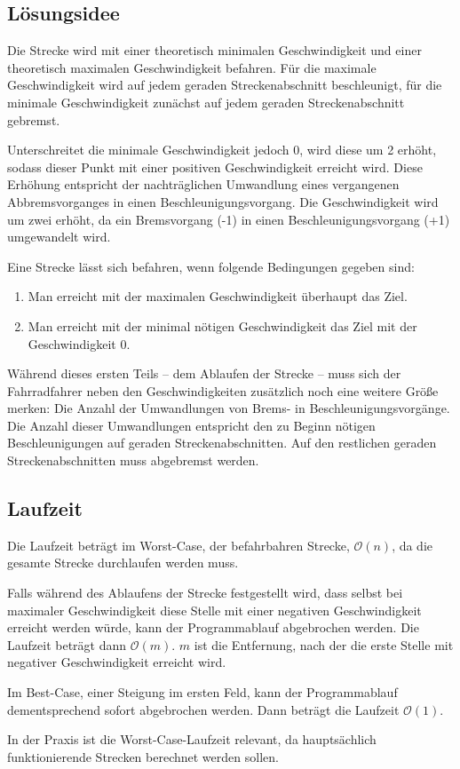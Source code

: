 \subsection {Lösungsidee}
	Die Strecke wird mit einer theoretisch minimalen Geschwindigkeit und einer theoretisch maximalen Geschwindigkeit befahren. 
	Für die maximale Geschwindigkeit wird auf jedem geraden Streckenabschnitt beschleunigt, für die minimale Geschwindigkeit zunächst auf jedem geraden Streckenabschnitt gebremst.

	Unterschreitet die minimale Geschwindigkeit jedoch 0, wird diese um 2 erhöht, sodass dieser Punkt mit einer positiven Geschwindigkeit erreicht wird.
	Diese Erhöhung entspricht der nachträglichen Umwandlung eines vergangenen Abbremsvorganges in einen Beschleunigungsvorgang. Die Geschwindigkeit wird um zwei erhöht, da ein Bremsvorgang (-1) in einen Beschleunigungsvorgang (+1) umgewandelt wird.
	
	Eine Strecke lässt sich befahren, wenn folgende Bedingungen gegeben sind:
	\begin{enumerate}
		\item Man erreicht mit der maximalen Geschwindigkeit überhaupt das Ziel.
		\item Man erreicht mit der minimal nötigen Geschwindigkeit das Ziel mit der Geschwindigkeit 0.
	\end{enumerate}

	Während dieses ersten Teils – dem Ablaufen der Strecke – muss sich der Fahrradfahrer neben den Geschwindigkeiten zusätzlich noch
	eine weitere Größe merken: Die Anzahl der Umwandlungen von Brems- in Beschleunigungsvorgänge. Die Anzahl dieser Umwandlungen entspricht
	den zu Beginn nötigen Beschleunigungen auf geraden Streckenabschnitten. Auf den restlichen geraden Streckenabschnitten muss abgebremst werden.
\subsection{Laufzeit}
	Die Laufzeit beträgt im Worst-Case, der befahrbahren Strecke, \(\mathcal O(n)\), da die gesamte Strecke durchlaufen werden muss.
	
	Falls während des Ablaufens der Strecke festgestellt wird, dass selbst bei maximaler Geschwindigkeit diese Stelle mit einer negativen Geschwindigkeit erreicht werden würde, kann der Programmablauf abgebrochen werden. Die Laufzeit beträgt dann \(\mathcal O(m)\). \(m\) ist die Entfernung, nach der die erste Stelle mit negativer Geschwindigkeit erreicht wird.
	
	Im Best-Case, einer Steigung im ersten Feld, kann der Programmablauf dementsprechend sofort abgebrochen werden. Dann beträgt die Laufzeit \(\mathcal O(1)\).
	
	In der Praxis ist die Worst-Case-Laufzeit relevant, da hauptsächlich funktionierende Strecken berechnet werden sollen. 
